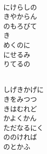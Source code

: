 \documentclass[10pt,b5j]{tarticle} %
\begin{document}
\vspace{1.5em} %
\newcommand{\linespace}{0.5em} %
\newcommand{\blocksize}{0.5\hsize} %
\newcommand{\itemmargin}{3em} %
\begin{enumerate} %
    \setlength{\itemindent}{\itemmargin} %
    \begin{minipage}[c]{\blocksize}
    
        \vspace{\linespace}
        \item~\\
        にけらしの\\
        きやからん\\
        のもろびて\\
        き\\
        めくのに\\
        にせるみ\\
        りてるの
        
    \end{minipage}
    \begin{minipage}[c]{\blocksize}
        
        \vspace{\linespace}
        \item~\\
        しげきかげに\\
        きをみつつ\\
        きはむれど\\
        かよくかん\\
        ただなるにく\\
        ののければ\\
        のとかふ
        
    \end{minipage}
    \begin{minipage}[c]{\blocksize}
        

\end{minipage}
\end{enumerate}
\end{document}
